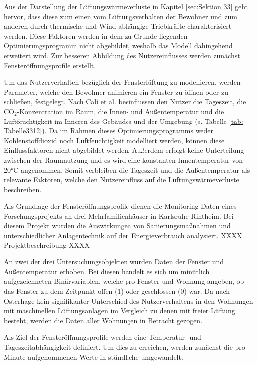 Aus der Darstellung der Lüftungswärmeverluste in Kapitel \ref{sec:Sektion 33} geht hervor, dass diese zum einen vom Lüftungsverhalten der Bewohner und zum anderen durch thermische und Wind abhängige Triebkräfte charakterisiert werden.
Diese Faktoren werden in dem zu Grunde liegenden Optimierungsprogramm nicht abgebildet, weshalb das Modell dahingehend erweitert wird.
Zur besseren Abbildung des Nutzereinflusses werden zunächst Fensteröffnungsprofile erstellt.

Um das Nutzerverhalten bezüglich der Fensterlüftung zu modellieren, werden Parameter, welche den Bewohner animieren ein Fenster zu öffnen oder zu schließen, festgelegt.
Nach Calí et al. beeinflussen den Nutzer die Tageszeit, die CO\(_2\)-Konzentration im Raum, die Innen- und Außentemperatur und die Luftfeuchtigkeit im Inneren des Gebäudes und der Umgebung (s. Tabelle \ref{tab: Tabelle3312}).
Da im Rahmen dieses Optimierungsprogramms weder Kohlenstoffdioxid noch Luftfeuchtigkeit modelliert werden, können diese Einflussfaktoren nicht abgebildet werden.
Außerdem erfolgt keine Unterteilung zwischen der Raumnutzung und es wird eine konstanten Innentemperatur von 20°C angenommen.
Somit verbleiben die Tageszeit und die Außentemperatur als relevante Faktoren, welche den Nutzereinfluss auf die Lüftungswärmeverluste beschreiben.

Als Grundlage der Fensteröffnungsprofile dienen die Monitoring-Daten eines Forschungsprojekts an drei Mehrfamilienhäuser in Karlsruhe-Rintheim.
Bei diesem Projekt wurden die Auswirkungen von Sanierungsmaßnahmen und unterschiedlicher Anlagentechnik auf den Energieverbrauch analysiert.
XXXX Projektbeschreibung XXXX

An zwei der drei Untersuchungsobjekten wurden Daten der Fenster und Außentemperatur erhoben.
Bei diesen handelt es sich um minütlich aufgezeichneten Binärvariablen, welche pro Fenster und Wohnung angeben, ob das Fenster zu dem Zeitpunkt offen (1) oder geschlossen (0) war.
Da nach Osterhage \cite{Osterhage.2018} kein signifikanter Unterschied des Nutzerverhaltens in den Wohnungen mit maschinellen Lüftungsanlagen im Vergleich zu denen mit freier Lüftung besteht, werden die Daten aller Wohnungen in Betracht gezogen.

Als Ziel der Fensteröffnungsprofile werden eine Temperatur- und Tageszeitabhängigkeit definiert.
Um dies zu erreichen, werden zunächst die pro Minute aufgenommenen Werte in stündliche umgewandelt.

